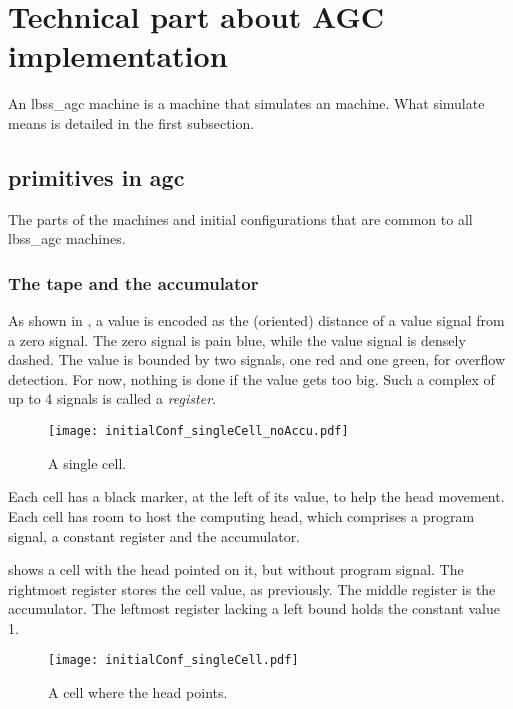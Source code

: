 \section{Technical part about AGC implementation}


An lbss\_agc machine is a machine that simulates an \RLTM machine.
What simulate means is detailed in the first subsection.

\subsection{primitives in agc}
The parts of the machines and initial configurations that are common to all lbss\_agc machines.

\subsubsection{The tape and the accumulator}

As shown in , a value is encoded as the (oriented) distance of a value signal from a zero signal.
The zero signal is pain blue, while the value signal is densely dashed.
The value is bounded by two signals, one red and one green, for overflow detection.
For now, nothing is done if the value gets too big.
Such a complex of up to 4 signals is called a \emph{register}.
\begin{figure}[hbt]
	\centering
	\small%
	\texttt{[image: initialConf\_singleCell\_noAccu.pdf]}%
	\caption{A single cell.}
	\label{fig:initialConfiguration:singleRegister}
\end{figure}


Each cell has a black marker, at the left of its value, to help the head movement.
Each cell has room to host the computing head, which comprises a program signal, a constant register and the accumulator.

 shows a cell with the head pointed on it, but without program signal.
The rightmost register stores the cell value, as previously.
The middle register is the accumulator.
The leftmost register lacking a left bound holds the constant value 1.

\begin{figure}[hbt]
	\centering
	\small%
	\texttt{[image: initialConf\_singleCell.pdf]}%
	\caption{A cell where the head points.}
	\label{fig:initialConfiguration:singleCellWithAccu}
\end{figure}


